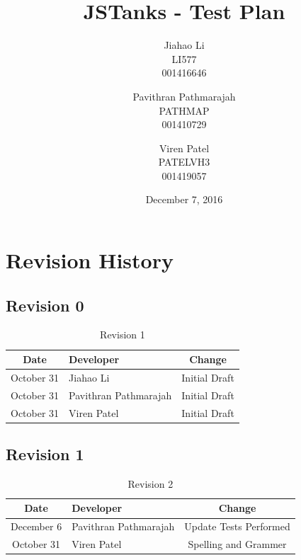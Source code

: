 \documentclass{article}
\begin{document}
\newpage
\title{JSTanks - Test Plan}
\date{December 7, 2016}
\author{Jiahao Li\\LI577\\001416646\and Pavithran Pathmarajah\\PATHMAP\\
001410729 \and Viren Patel\\PATELVH3\\001419057}

\maketitle

\newpage
{}
\tableofcontents
\newpage
\listoftables

\newpage
\listoffigures

\newpage
\section{Revision History}
\subsection{Revision 0}
\begin{table}[H]
\caption{Revision 1}
	\begin{tabularx}{\textwidth}{cXc}
		\toprule
		Date & Developer & Change\\
		\midrule
		October 31&Jiahao Li &Initial Draft \\
		October 31&Pavithran Pathmarajah &Initial Draft\\
		October 31&Viren Patel  &Initial Draft\\
	\end{tabularx}
\end{table}

\subsection{Revision 1}
\begin{table}[H]
\caption{Revision 2}
	\begin{tabularx}{\textwidth}{cXc}
		\toprule
		Date & Developer & Change\\
		\midrule
		December 6&Pavithran Pathmarajah & Update Tests Performed\\
		October 31&Viren Patel  &Spelling and Grammer\\
	\end{tabularx}
\end{table}
\end{document}

